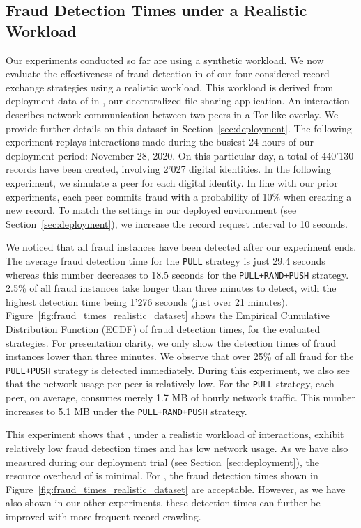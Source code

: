 \subsection{Fraud Detection Times under a Realistic Workload}
\label{subsec:realistic_workload}
Our experiments conducted so far are using a synthetic workload.
We now evaluate the effectiveness of fraud detection in \ModelName{} of our four considered record exchange strategies using a realistic workload.
This workload is derived from deployment data of \ModelName{} in \Tribler{}, our decentralized file-sharing application.
An interaction describes network communication between two peers in a Tor-like overlay.
We provide further details on this dataset in Section~\ref{sec:deployment}.
The following experiment replays interactions made during the busiest 24 hours of our deployment period: November 28, 2020.
On this particular day, a total of 440'130 records have been created, involving 2'027 digital identities.
In the following experiment, we simulate a peer for each digital identity.
In line with our prior experiments, each peer commits fraud with a probability of 10\% when creating a new record.
To match the \ModelName{} settings in our deployed environment (see Section~\ref{sec:deployment}), we increase the record request interval to 10 seconds.

We noticed that all fraud instances have been detected after our experiment ends.
The average fraud detection time for the \texttt{PULL} strategy is just 29.4 seconds whereas this number decreases to 18.5 seconds for the \texttt{PULL+RAND+PUSH} strategy.
2.5\% of all fraud instances take longer than three minutes to detect, with the highest detection time being 1'276 seconds (just over 21 minutes).
Figure~\ref{fig:fraud_times_realistic_dataset} shows the Empirical Cumulative Distribution Function (ECDF) of fraud detection times, for the evaluated strategies.
For presentation clarity, we only show the detection times of fraud instances lower than three minutes.
We observe that over 25\% of all fraud for the \texttt{PULL+PUSH} strategy is detected immediately.
During this experiment, we also see that the network usage per peer is relatively low.
For the \texttt{PULL} strategy, each peer, on average, consumes merely 1.7 MB of hourly network traffic.
This number increases to 5.1 MB under the \texttt{PULL+RAND+PUSH} strategy.

This experiment shows that \ModelName{}, under a realistic workload of \Tribler{} interactions, exhibit relatively low fraud detection times and has low network usage.
As we have also measured during our deployment trial (see Section~\ref{sec:deployment}), the resource overhead of \ModelName{} is minimal.
For \Tribler{}, the fraud detection times shown in Figure~\ref{fig:fraud_times_realistic_dataset} are acceptable.
However, as we have also shown in our other experiments, these detection times can further be improved with more frequent record crawling.

